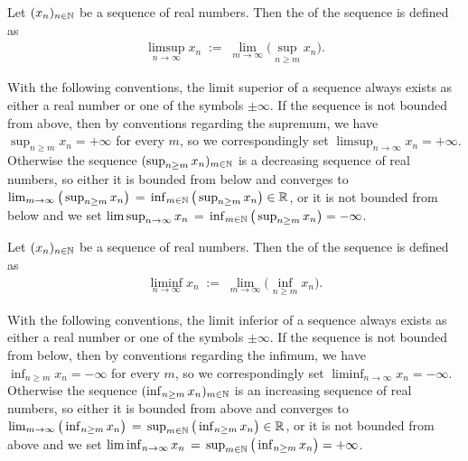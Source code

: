 \begin{definition}
  \label{def:limsup}
  Let $(x_n)_{n \in \mathbb{N}}$ be a sequence of real numbers.
  Then the  of the sequence is defined as
  \begin{align*}
    \limsup_{n \to \infty} x_n \; := \; \lim_{m \to \infty} \Big( \sup_{n \ge m} x_n \Big) .
  \end{align*}

  With the following conventions, the limit superior of a sequence always exists
  as either a real number or one of the symbols $\pm\infty$.
  If the sequence is not bounded from above, then by
  conventions regarding the supremum, we have
  $\sup_{n \ge m} x_n = +\infty$ for every $m$, so we correspondingly
  set $\limsup_{n \to \infty} x_n = +\infty$.
  Otherwise the sequence $(\sup_{n \ge m} x_n)_{m \in \mathbb{N}}$
  is a decreasing sequence of real numbers, so either it is
  bounded from below and converges to
  $\lim_{m \to \infty} \big( \sup_{n \ge m} x_n \big) \, = \,
  \inf_{m \in \mathbb{N}} \big( \sup_{n \ge m} x_n \big) \in \mathbb{R}$,
  or it is not bounded from below and we set
  $\limsup_{n \to \infty} x_n \, = \,
  \inf_{m \in \mathbb{N}} \big( \sup_{n \ge m} x_n \big) = -\infty$.
\end{definition}

\begin{definition}
  \label{def:liminf}
  Let $(x_n)_{n \in \mathbb{N}}$ be a sequence of real numbers.
  Then the  of the sequence is defined as
  \begin{align*}
    \liminf_{n \to \infty} x_n \; := \; \lim_{m \to \infty} \Big( \inf_{n \ge m} x_n \Big) .
  \end{align*}

  With the following conventions, the limit inferior of a sequence always exists
  as either a real number or one of the symbols $\pm \infty$.
  If the sequence is not bounded from below, then by
  conventions regarding the infimum, we have
  $\inf_{n \ge m} x_n = -\infty$ for every $m$, so we correspondingly
  set $\liminf_{n \to \infty} x_n = -\infty$.
  Otherwise the sequence $(\inf_{n \ge m} x_n)_{m \in \mathbb{N}}$
  is an increasing sequence of real numbers, so either it is
  bounded from above and converges to
  $\lim_{m \to \infty} \big( \inf_{n \ge m} x_n \big) \, = \,
  \sup_{m \in \mathbb{N}} \big( \inf_{n \ge m} x_n \big) \in \mathbb{R}$,
  or it is not bounded from above and we set
  $\liminf_{n \to \infty} x_n \, = \,
  \sup_{m \in \mathbb{N}} \big( \inf_{n \ge m} x_n \big) = +\infty$.
\end{definition}

